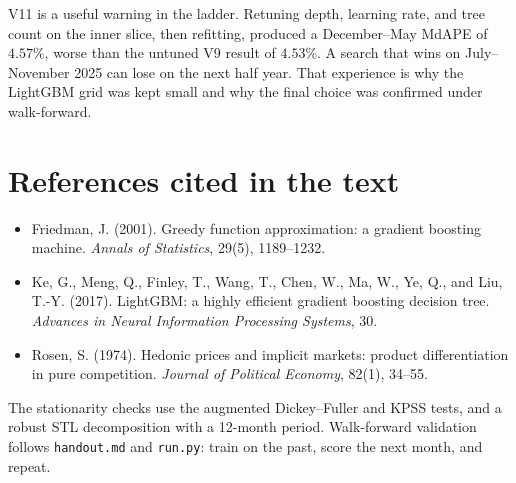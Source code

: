 \documentclass[11pt]{article}
\begin{document}
\noindent V11 is a useful warning in the ladder. Retuning depth, learning rate, and tree count on the inner slice, then refitting, produced a December--May MdAPE of \(4.57\%\), worse than the untuned V9 result of \(4.53\%\). A search that wins on July--November 2025 can lose on the next half year. That experience is why the LightGBM grid was kept small and why the final choice was confirmed under walk-forward.

\section{References cited in the text}

\begin{itemize}
\item Friedman, J. (2001). Greedy function approximation: a gradient boosting machine. \emph{Annals of Statistics}, 29(5), 1189--1232.
\item Ke, G., Meng, Q., Finley, T., Wang, T., Chen, W., Ma, W., Ye, Q., and Liu, T.-Y. (2017).
LightGBM: a highly efficient gradient boosting decision tree.
\emph{Advances in Neural Information Processing Systems}, 30.
\item Rosen, S. (1974). Hedonic prices and implicit markets: product differentiation in pure competition. \emph{Journal of Political Economy}, 82(1), 34--55.
\end{itemize}

The stationarity checks use the augmented Dickey--Fuller and KPSS tests, and a robust STL decomposition with a 12-month period. Walk-forward validation follows \texttt{handout.md} and \texttt{run.py}: train on the past, score the next month, and repeat.
\end{document}
